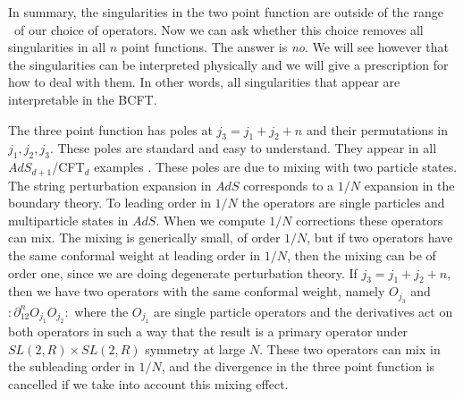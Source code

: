 In summary, the singularities in the two point function are
outside of the range \range\ of our choice of operators.
Now we can ask whether this choice removes all singularities in all
$n$ point functions. The answer is {\it no}. We will see however that the
singularities can be interpreted physically and we will give a
prescription for how to deal with them. In other words, all
singularities that appear are interpretable in the BCFT.




The three point function has poles at $j_3 = j_1 + j_2 + n$ and
their permutations in $j_1, j_2, j_3$.
These poles are standard and easy to understand. They appear in
all $AdS_{d+1}$/CFT$_d$  examples \lref{} \lref{}
.
These poles are due to mixing with two particle states. The string
perturbation expansion in $AdS$ corresponds to a $1/N$ expansion in the
boundary theory. To leading order in $1/N$ the operators are single
particles and multiparticle states in $AdS$. When we compute $1/N$ corrections
these operators can mix. The mixing is  generically small, of
order $1/N$,  but
if two operators have the same conformal weight at leading order in $1/N$,
then the mixing can be of order one, since we are doing degenerate
perturbation theory. If $j_3 = j_1 + j_2 + n$, then we have
two operators with the same conformal weight,  namely $O_{j_3}$
and $: \partial^n_{12}O_{j_1}
O_{j_2}:$ where the $O_{j_1}$ are single
particle operators and the derivatives act on both
operators
in such a way that the result is a primary operator
under $SL(2,R) \times SL(2,R)$ symmetry at large $N$.
These two operators can mix in the subleading order in $1/N$,
and the divergence in the three point function is cancelled
if we take into account this mixing effect.


\ifig{}
{}

